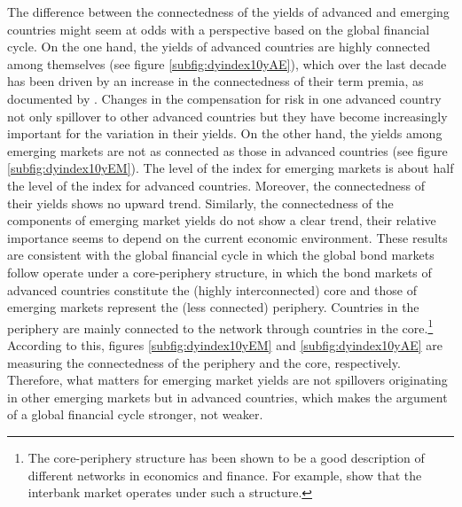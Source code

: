 {The difference between the connectedness of the yields of advanced and emerging countries might seem at odds with a perspective based on the global financial cycle.
On the one hand, the yields of advanced countries are highly connected among themselves (see figure \ref{subfig:dyindex10yAE}), which over the last decade has been driven by an increase in the connectedness of their term premia, as documented by \cite{ACDM:2019}.
Changes in the compensation for risk in one advanced country not only spillover to other advanced countries but they have become increasingly important for the variation in their yields.
On the other hand, the yields among emerging markets are not as connected as those in advanced countries (see figure \ref{subfig:dyindex10yEM}).
The level of the index for emerging markets is about half the level of the index for advanced countries.
Moreover, the connectedness of their yields shows no upward trend. 
Similarly, the connectedness of the components of emerging market yields do not show a clear trend, their relative importance seems to depend on the current economic environment.
These results are consistent with the global financial cycle in which the global bond markets follow operate under a core-periphery structure, in which the bond markets of advanced countries constitute the (highly interconnected) core and those of emerging markets represent the (less connected) periphery.
Countries in the periphery are mainly connected to the network through countries in the core.\footnote{ The core-periphery structure has been shown to be a good description of different networks in economics and finance. For example, \cite{CvP:2014} show that the interbank market operates under such a structure.}
According to this, figures \ref{subfig:dyindex10yEM} and \ref{subfig:dyindex10yAE} are measuring the connectedness of the periphery and the core, respectively.
Therefore, what matters for emerging market yields are not spillovers originating in other emerging markets but in advanced countries, which makes the argument of a global financial cycle stronger, not weaker.

}
